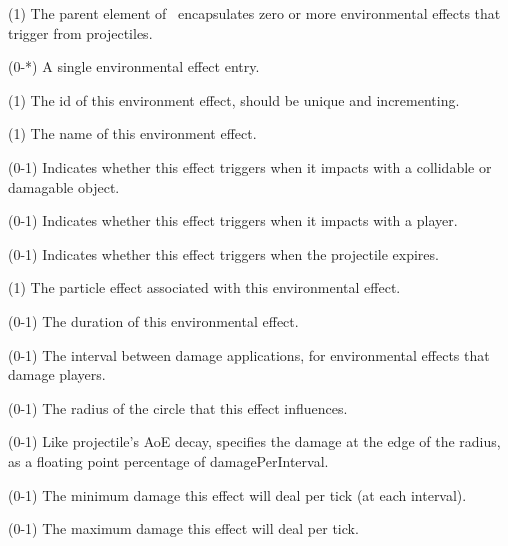 \begin{description}
\item {} (1)  The parent element of \EnvProps\ encapsulates zero or more environmental effects that trigger from projectiles.
\item {} (0-*)  A single environmental effect entry.
\item {} (1)  The id of this environment effect, should be unique and incrementing.
\item {} (1)  The name of this environment effect.
\item {} (0-1)  Indicates whether this effect triggers when it impacts with a collidable or damagable object.
\item {} (0-1)  Indicates whether this effect triggers when it impacts with a player.
\item {} (0-1) Indicates whether this effect triggers when the projectile expires.
\item {} (1)  The particle effect associated with this environmental effect.
\item {} (0-1)  The duration of this environmental effect.
\item {} (0-1)  The interval between damage applications, for environmental effects that damage players.
\item {} (0-1)  The radius of the circle that this effect influences.
\item {} (0-1)  Like projectile's AoE decay, specifies the damage at the edge of the radius, as a floating point percentage of damagePerInterval.
\item {} (0-1)  The minimum damage this effect will deal per tick (at each interval).
\item {} (0-1)  The maximum damage this effect will deal per tick.
\end{description}